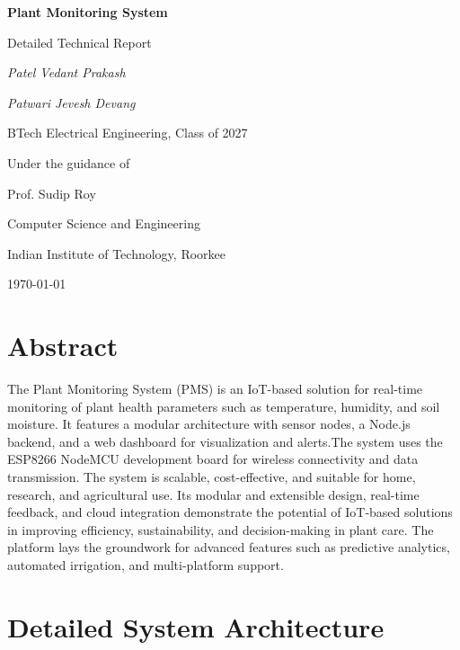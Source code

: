 \documentclass[12pt,a4paper]{article}
\begin{document}
\begin{titlepage}
    \centering
    \vspace*{2cm}
    {\Huge\bfseries Plant Monitoring System\par}
    \vspace{1cm}
    {\Large Detailed Technical Report\par}
    \vspace{2cm}
    {\Large\itshape Patel Vedant Prakash\par}
    {\Large\itshape Patwari Jevesh Devang\par}
    \vspace{1cm}
    {\large BTech Electrical Engineering, Class of 2027\par}
    \vspace{2cm}
    {\large Under the guidance of\par}
    {\large Prof. Sudip Roy\par}
    {\large Computer Science and Engineering\par}
    \vspace{2cm}
    {\large Indian Institute of Technology, Roorkee\par}
    \vfill
    {\large \today\par}
\end{titlepage}

\tableofcontents
\newpage

\section*{Abstract}
The Plant Monitoring System (PMS) is an IoT-based solution for real-time monitoring of plant health parameters such as temperature, humidity, and soil moisture. It features a modular architecture with sensor nodes, a Node.js backend, and a web dashboard for visualization and alerts.The system uses the ESP8266 NodeMCU development board for wireless connectivity and data transmission. The system is scalable, cost-effective, and suitable for home, research, and agricultural use. Its modular and extensible design, real-time feedback, and cloud integration demonstrate the potential of IoT-based solutions in improving efficiency, sustainability, and decision-making in plant care. The platform lays the groundwork for advanced features such as predictive analytics, automated irrigation, and multi-platform support.

\section{Detailed System Architecture}
\end{document}
